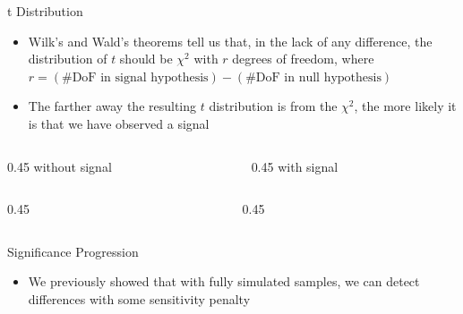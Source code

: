 \documentclass[notheorems]{beamer}
\begin{document}
\begin{frame}{t Distribution}
    \begin{itemize}
        \item Wilk's and Wald's theorems tell us that, in the lack of any difference, the distribution of $t$ should be $\chi^2$ with $r$ degrees of freedom, where $r = (\text{\#DoF in signal hypothesis}) - (\text{\#DoF in null hypothesis})$
        \item The farther away the resulting $t$ distribution is from the $\chi^2$, the more likely it is that we have observed a signal
    \end{itemize}
    \begin{center}
    \begin{columns}[c]
        \begin{column}{0.45\textwidth}
            \centering
            without signal
        \end{column}
        \begin{column}{0.45\textwidth}
            \centering
            with signal
        \end{column}
    \end{columns}
    \vspace{0.3cm}
    \begin{columns}[c]
        \begin{column}{0.45\textwidth}
            \centering
        \end{column}
        \begin{column}{0.45\textwidth}
            \centering
        \end{column}
    \end{columns}
    \end{center}
\end{frame}

\begin{frame}{Significance Progression}
    \begin{itemize}
        \item We previously showed that with fully simulated samples, we can detect differences with some sensitivity penalty
    \end{itemize}
    \vspace{1cm}
\end{frame}
\end{document}
